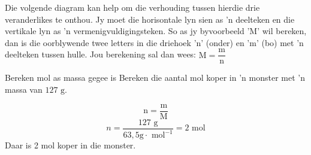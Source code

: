       \label{m38717*id277605}
Die volgende diagram kan help om die verhouding tussen hierdie drie veranderlikes te onthou. Jy moet die horisontale lyn sien as  'n deelteken en die vertikale lyn as  'n ver\-me\-nig\-vul\-dig\-ings\-te\-ken. So as jy byvoorbeeld 'M' wil bereken, dan is die oorblywende twee letters in  die driehoek 'n' (onder) en 'm' (bo) met 'n deelteken tussen hulle. Jou berekening sal dan wees:
 $\text{M}=\dfrac{\text{m}}{\text{n}}$
      \label{m38717*id277613}
    \setcounter{subfigure}{0}
	\begin{figure}[H] %
\begin{center}
\end{center}
 \end{figure}       
      \par 
\label{m38717*secfhsst!!!underscore!!!id409}
      \noindent
      \begin{wex}{Bereken mol as massa gegee is}{
\label{m38717*probfhsst!!!underscore!!!id410}
      \label{m38717*id277635}Bereken die aantal mol koper in 'n monster met 'n massa van $127 \text{ g}$. 
      }
{
      \label{m38717*id277680}\nopagebreak\noindent{}
        
    \begin{equation*}
    \text{n}=\frac{\text{m}}{\text{M}}
      \end{equation*}
      \label{m38717*id277705}\nopagebreak\noindent{}
    \begin{equation*}
    n=\frac{127 \text{ g}}{63,5 \text{g} \cdot \text{ mol}^{-1}}=2 \text{ mol}
      \end{equation*}
      \label{m38717*id277735}Daar is 2 mol koper in die monster.
}
    \end{wex}
    
